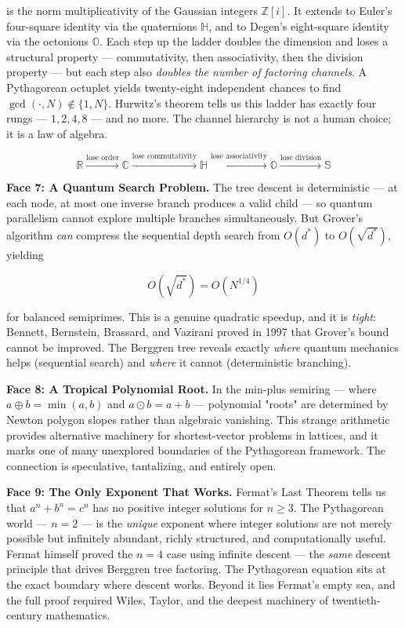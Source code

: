 is the norm multiplicativity of the Gaussian integers $\mathbb{Z}[i]$. It extends to Euler's four-square identity via the quaternions $\mathbb{H}$, and to Degen's eight-square identity via the octonions $\mathbb{O}$. Each step up the ladder doubles the dimension and loses a structural property --- commutativity, then associativity, then the division property --- but each step also \textit{doubles the number of factoring channels}. A Pythagorean octuplet yields twenty-eight independent chances to find $\gcd(\cdot, N) \notin \{1, N\}$. Hurwitz's theorem tells us this ladder has exactly four rungs --- $1, 2, 4, 8$ --- and no more. The channel hierarchy is not a human choice; it is a law of algebra.

\[
\mathbb{R} \xrightarrow{\text{lose order}} \mathbb{C} \xrightarrow{\text{lose commutativity}} \mathbb{H} \xrightarrow{\text{lose associativity}} \mathbb{O} \xrightarrow{\text{lose division}} \mathbb{S}
\]

\textbf{Face 7: A Quantum Search Problem.} The tree descent is deterministic --- at each node, at most one inverse branch produces a valid child --- so quantum parallelism cannot explore multiple branches simultaneously. But Grover's algorithm \textit{can} compress the sequential depth search from $O(d^*)$ to $O(\sqrt{d^*})$, yielding

\[
O(\sqrt{d^*}) = O(N^{1/4})
\]

for balanced semiprimes. This is a genuine quadratic speedup, and it is \textit{tight}: Bennett, Bernstein, Brassard, and Vazirani proved in 1997 that Grover's bound cannot be improved. The Berggren tree reveals exactly \textit{where} quantum mechanics helps (sequential search) and \textit{where} it cannot (deterministic branching).

\textbf{Face 8: A Tropical Polynomial Root.} In the min-plus semiring --- where $a \oplus b = \min(a,b)$ and $a \odot b = a + b$ --- polynomial "roots" are determined by Newton polygon slopes rather than algebraic vanishing. This strange arithmetic provides alternative machinery for shortest-vector problems in lattices, and it marks one of many unexplored boundaries of the Pythagorean framework. The connection is speculative, tantalizing, and entirely open.

\textbf{Face 9: The Only Exponent That Works.} Fermat's Last Theorem tells us that $a^n + b^n = c^n$ has no positive integer solutions for $n \geq 3$. The Pythagorean world --- $n = 2$ --- is the \textit{unique} exponent where integer solutions are not merely possible but infinitely abundant, richly structured, and computationally useful. Fermat himself proved the $n = 4$ case using infinite descent --- the \textit{same} descent principle that drives Berggren tree factoring. The Pythagorean equation sits at the exact boundary where descent works. Beyond it lies Fermat's empty sea, and the full proof required Wiles, Taylor, and the deepest machinery of twentieth-century mathematics.


